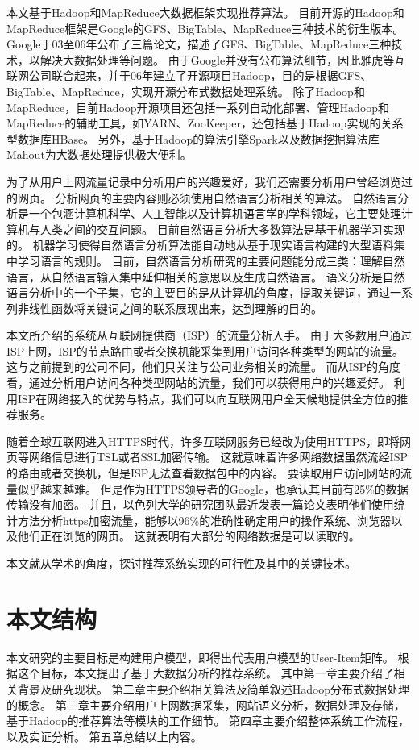 本文基于Hadoop和MapReduce大数据框架实现推荐算法。
目前开源的Hadoop和MapReduce框架是Google的GFS、BigTable、MapReduce三种技术的衍生版本。
Google于03至06年公布了三篇论文，描述了GFS、BigTable、MapReduce三种技术\parencite{Ghemawat2004MapReduce,Ghemawat2003The,Chang2008Bigtable}，以解决大数据处理等问题。
由于Google并没有公布算法细节，因此雅虎等互联网公司联合起来，并于06年建立了开源项目Hadoop，目的是根据GFS、BigTable、MapReduce，实现开源分布式数据处理系统。
除了Hadoop和MapReduce，目前Hadoop开源项目还包括一系列自动化部署、管理Hadoop和MapReduce的辅助工具，如YARN、ZooKeeper，还包括基于Hadoop实现的关系型数据库HBase。
另外，基于Hadoop的算法引擎Spark以及数据挖掘算法库Mahout为大数据处理提供极大便利。

为了从用户上网流量记录中分析用户的兴趣爱好，我们还需要分析用户曾经浏览过的网页。
分析网页的主要内容则必须使用自然语言分析相关的算法。
自然语言分析是一个包涵计算机科学、人工智能以及计算机语言学的学科领域，它主要处理计算机与人类之间的交互问题。
目前自然语言分析大多数算法是基于机器学习实现的。
机器学习使得自然语言分析算法能自动地从基于现实语言构建的大型语料集中学习语言的规则。
目前，自然语言分析研究的主要问题能分成三类：理解自然语言，从自然语言输入集中延伸相关的意思以及生成自然语言。
语义分析是自然语言分析中的一个子集，它的主要目的是从计算机的角度，提取关键词，通过一系列非线性函数将关键词之间的联系展现出来，达到理解的目的。

本文所介绍的系统从互联网提供商（ISP）的流量分析入手。
由于大多数用户通过ISP上网，ISP的节点路由或者交换机能采集到用户访问各种类型的网站的流量。
这与之前提到的公司不同，他们只关注与公司业务相关的流量。
而从ISP的角度看，通过分析用户访问各种类型网站的流量，我们可以获得用户的兴趣爱好。
利用ISP在网络接入的优势与特点，我们可以向互联网用户全天候地提供全方位的推荐服务。

随着全球互联网进入HTTPS时代，许多互联网服务已经改为使用HTTPS，即将网页等网络信息进行TSL或者SSL加密传输。
这就意味着许多网络数据虽然流经ISP的路由或者交换机，但是ISP无法查看数据包中的内容。
要读取用户访问网站的流量似乎越来越难。
但是作为HTTPS领导者的Google，也承认其目前有25\%的数据传输没有加密。
并且，以色列大学的研究团队最近发表一篇论文表明他们使用统计方法分析https加密流量，能够以96\%的准确性确定用户的操作系统、浏览器以及他们正在浏览的网页。
这就表明有大部分的网络数据是可以读取的。

本文就从学术的角度，探讨推荐系统实现的可行性及其中的关键技术。

\section{本文结构}
本文研究的主要目标是构建用户模型，即得出代表用户模型的User-Item矩阵。
根据这个目标，本文提出了基于大数据分析的推荐系统。
其中第一章主要介绍了相关背景及研究现状。
第二章主要介绍相关算法及简单叙述Hadoop分布式数据处理的概念。
第三章主要介绍用户上网数据采集，网站语义分析，数据处理及存储，基于Hadoop的推荐算法等模块的工作细节。
第四章主要介绍整体系统工作流程，以及实证分析。
第五章总结以上内容。